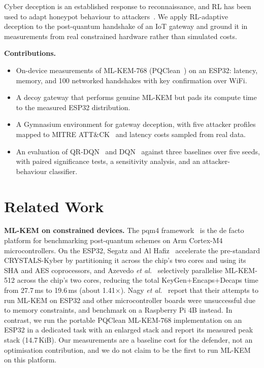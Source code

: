 \documentclass[conference]{IEEEtran}
\begin{document}
Cyber deception is an established response to reconnaissance, and RL has been
used to adapt honeypot behaviour to attackers~\cite{honeyiot}. We apply
RL-adaptive deception to the post-quantum handshake of an IoT gateway and ground
it in measurements from real constrained hardware rather than simulated costs.

\textbf{Contributions.}
\begin{itemize}
\item On-device measurements of ML-KEM-768 (PQClean~\cite{pqclean}) on an ESP32:
latency, memory, and 100 networked handshakes with key confirmation over WiFi.
\item A decoy gateway that performs genuine ML-KEM but pads its compute time to the
measured ESP32 distribution.
\item A Gymnasium environment for gateway deception, with five attacker profiles
mapped to MITRE ATT\&CK~\cite{attack} and latency costs sampled from real data.
\item An evaluation of QR-DQN~\cite{qrdqn} and DQN~\cite{dqn} against three
baselines over five seeds, with paired significance tests, a sensitivity analysis,
and an attacker-behaviour classifier.
\end{itemize}

\section{Related Work}
\textbf{ML-KEM on constrained devices.} The pqm4 framework~\cite{pqm4} is the
de facto platform for benchmarking post-quantum schemes on Arm Cortex-M4
microcontrollers. On the ESP32, Segatz and Al Hafiz~\cite{segatz} accelerate
the pre-standard CRYSTALS-Kyber by partitioning it across the chip's two cores
and using its SHA and AES coprocessors, and Azevedo \emph{et al.}~\cite{azevedo} selectively
parallelise ML-KEM-512 across the chip's two cores, reducing the total
KeyGen+Encaps+Decaps time from 27.7\,ms to 19.6\,ms (about 1.41$\times$). Nagy
\emph{et al.}~\cite{nagy} report that their attempts to run ML-KEM on ESP32 and
other microcontroller boards were unsuccessful due to memory constraints, and
benchmark on a Raspberry Pi 4B instead. In contrast, we run the portable PQClean
ML-KEM-768 implementation on an ESP32 in a dedicated task with an enlarged stack
and report its measured peak stack (14.7\,KiB). Our measurements are a baseline
cost for the defender, not an optimisation contribution, and we do not claim to be
the first to run ML-KEM on this platform.
\end{document}
